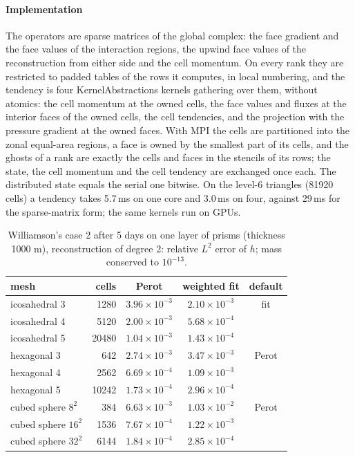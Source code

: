 \documentclass[preprint,12pt]{elsarticle}
\theoremstyle{definition}
\begin{document}
\paragraph{Implementation} The operators are sparse matrices of the global complex: the face gradient
and the face values of the interaction regions, the upwind face values of the reconstruction from
either side and the cell momentum. On every rank they are restricted to padded tables of the rows
it computes, in local numbering, and the tendency is four KernelAbstractions kernels gathering over
them, without atomics: the cell momentum at the owned cells, the face values and fluxes at the
interior faces of the owned cells, the cell tendencies, and the projection with the pressure gradient
at the owned faces. With MPI the cells are partitioned into the zonal equal-area regions, a face is
owned by the smallest part of its cells, and the ghosts of a rank are exactly the cells and faces in
the stencils of its rows; the state, the cell momentum and the cell tendency are exchanged once
each. The distributed state equals the serial one bitwise. On the level-6 triangles (81920 cells)
a tendency takes 5.7\,ms on one core and 3.0\,ms on four, against 29\,ms for the sparse-matrix
form; the same kernels run on GPUs.

\begin{table}[h]
\centering
\caption{Williamson's case 2 after 5 days on one layer of prisms (thickness 1000 m), reconstruction of
degree 2: relative $L^2$ error of $h$; mass conserved to $10^{-13}$.}
\label{tab:w2}
\begin{tabular}{lrccc}
\toprule
mesh & cells & Perot & weighted fit & default \\
\midrule
icosahedral 3 & 1280 & $3.96\times10^{-3}$ & $2.10\times10^{-3}$ & fit \\
icosahedral 4 & 5120 & $2.00\times10^{-3}$ & $5.68\times10^{-4}$ & \\
icosahedral 5 & 20480 & $1.04\times10^{-3}$ & $1.43\times10^{-4}$ & \\
hexagonal 3 & 642 & $2.74\times10^{-3}$ & $3.47\times10^{-3}$ & Perot \\
hexagonal 4 & 2562 & $6.69\times10^{-4}$ & $1.09\times10^{-3}$ & \\
hexagonal 5 & 10242 & $1.73\times10^{-4}$ & $2.96\times10^{-4}$ & \\
cubed sphere $8^2$ & 384 & $6.63\times10^{-3}$ & $1.03\times10^{-2}$ & Perot \\
cubed sphere $16^2$ & 1536 & $7.67\times10^{-4}$ & $1.22\times10^{-3}$ & \\
cubed sphere $32^2$ & 6144 & $1.84\times10^{-4}$ & $2.85\times10^{-4}$ & \\
\bottomrule
\end{tabular}
\end{table}
\end{document}

